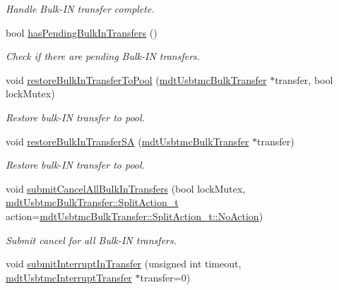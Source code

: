 \begin{DoxyCompactItemize}
\begin{DoxyCompactList}\small\item\em Handle Bulk-\/\-I\-N transfer complete. \end{DoxyCompactList}\item 
bool \hyperlink{classmdt_usbtmc_transfer_handler_a36bddb88b47a6622dc90749f86022976}{has\-Pending\-Bulk\-In\-Transfers} ()
\begin{DoxyCompactList}\small\item\em Check if there are pending Bulk-\/\-I\-N transfers. \end{DoxyCompactList}\item 
void \hyperlink{classmdt_usbtmc_transfer_handler_ac738d656946c3188e7b75e383b2faabf}{restore\-Bulk\-In\-Transfer\-To\-Pool} (\hyperlink{classmdt_usbtmc_bulk_transfer}{mdt\-Usbtmc\-Bulk\-Transfer} $\ast$transfer, bool lock\-Mutex)
\begin{DoxyCompactList}\small\item\em Restore bulk-\/\-I\-N transfer to pool. \end{DoxyCompactList}\item 
void \hyperlink{classmdt_usbtmc_transfer_handler_ade5c1500167266a8571d5a01b544100d}{restore\-Bulk\-In\-Transfer\-S\-A} (\hyperlink{classmdt_usbtmc_bulk_transfer}{mdt\-Usbtmc\-Bulk\-Transfer} $\ast$transfer)
\begin{DoxyCompactList}\small\item\em Restore bulk-\/\-I\-N transfer to pool. \end{DoxyCompactList}\item 
void \hyperlink{classmdt_usbtmc_transfer_handler_aa34dd4279e9dfef08d638285292036e8}{submit\-Cancel\-All\-Bulk\-In\-Transfers} (bool lock\-Mutex, \hyperlink{classmdt_usbtmc_bulk_transfer_a81f2309d821053cd7c8f6e32aff93b7c}{mdt\-Usbtmc\-Bulk\-Transfer\-::\-Split\-Action\-\_\-t} action=\hyperlink{classmdt_usbtmc_bulk_transfer_a81f2309d821053cd7c8f6e32aff93b7ca1e601ea653db1c729c9ee5746730fabe}{mdt\-Usbtmc\-Bulk\-Transfer\-::\-Split\-Action\-\_\-t\-::\-No\-Action})
\begin{DoxyCompactList}\small\item\em Submit cancel for all Bulk-\/\-I\-N transfers. \end{DoxyCompactList}\item 
void \hyperlink{classmdt_usbtmc_transfer_handler_ab6987e42a043dd860130e01f5f01a3ba}{submit\-Interrupt\-In\-Transfer} (unsigned int timeout, \hyperlink{classmdt_usbtmc_interrupt_transfer}{mdt\-Usbtmc\-Interrupt\-Transfer} $\ast$transfer=0)

\end{DoxyCompactItemize}
